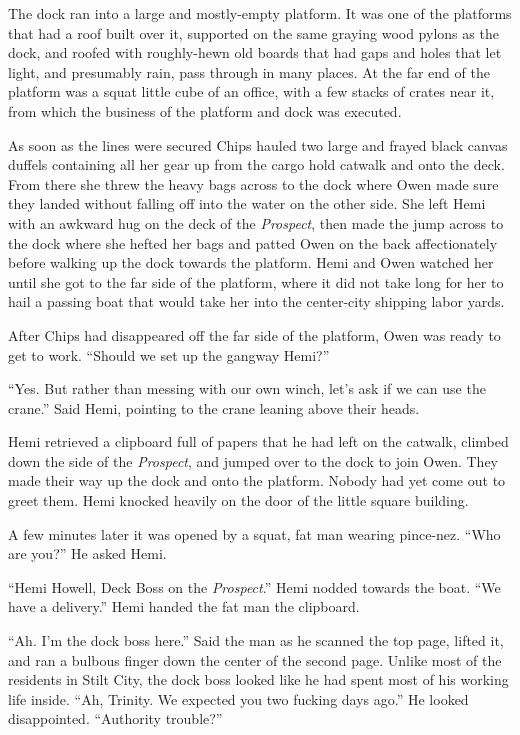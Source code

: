 \documentclass[
]{scrbook}
\begin{document}
The dock ran into a large and mostly-empty platform. It was one of the
platforms that had a roof built over it, supported on the same graying
wood pylons as the dock, and roofed with roughly-hewn old boards that
had gaps and holes that let light, and presumably rain, pass through in
many places. At the far end of the platform was a squat little cube of
an office, with a few stacks of crates near it, from which the business
of the platform and dock was executed.

As soon as the lines were secured Chips hauled two large and frayed
black canvas duffels containing all her gear up from the cargo hold
catwalk and onto the deck. From there she threw the heavy bags across to
the dock where Owen made sure they landed without falling off into the
water on the other side. She left Hemi with an awkward hug on the deck
of the \emph{Prospect}, then made the jump across to the dock where she
hefted her bags and patted Owen on the back affectionately before
walking up the dock towards the platform. Hemi and Owen watched her
until she got to the far side of the platform, where it did not take
long for her to hail a passing boat that would take her into the
center-city shipping labor yards.

After Chips had disappeared off the far side of the platform, Owen was
ready to get to work. ``Should we set up the gangway Hemi?''

``Yes. But rather than messing with our own winch, let's ask if we can
use the crane.'' Said Hemi, pointing to the crane leaning above their
heads.

Hemi retrieved a clipboard full of papers that he had left on the
catwalk, climbed down the side of the \emph{Prospect}, and jumped over
to the dock to join Owen. They made their way up the dock and onto the
platform. Nobody had yet come out to greet them. Hemi knocked heavily on
the door of the little square building.

A few minutes later it was opened by a squat, fat man wearing pince-nez.
``Who are you?'' He asked Hemi.

``Hemi Howell, Deck Boss on the \emph{Prospect}.'' Hemi nodded towards
the boat. ``We have a delivery.'' Hemi handed the fat man the clipboard.

``Ah. I'm the dock boss here.'' Said the man as he scanned the top page,
lifted it, and ran a bulbous finger down the center of the second page.
Unlike most of the residents in Stilt City, the dock boss looked like he
had spent most of his working life inside. ``Ah, Trinity. We expected
you two fucking days ago.'' He looked disappointed. ``Authority
trouble?''
\end{document}
